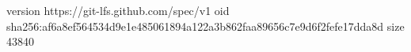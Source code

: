 version https://git-lfs.github.com/spec/v1
oid sha256:af6a8ef564534d9e1e485061894a122a3b862faa89656c7e9d6f2fefe17dda8d
size 43840
